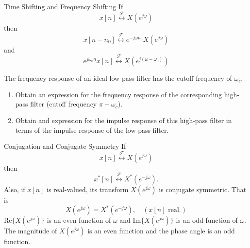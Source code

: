 \begin{frame}{Time Shifting and Frequency Shifting}
    If
    \begin{equation*}
        x[n] \overset{\mathcal{F}}{\leftrightarrow} X(e^{j\omega})
    \end{equation*}
    then
    \begin{equation*}
        x[n-n_0] \overset{\mathcal{F}}{\leftrightarrow} e^{-j\omega n_0}X(e^{j\omega})
    \end{equation*}
    and
    \begin{equation*}
        e^{j\omega_0 n}x[n] \overset{\mathcal{F}}{\leftrightarrow} X\left(e^{j(\omega - \omega_0)}\right)
    \end{equation*}
\end{frame}



\begin{frame}
    \begin{example}
        The frequency response of an ideal low-pass filter has the cutoff frequency of $\omega_c$.
        \begin{enumerate}
            \item Obtain an expression for the frequency response of the corresponding high-pass filter (cutoff frequency $\pi - \omega_c$).
            \item Obtain and expression for the impulse response of this high-pass filter in terms of the impulse response of the low-pass filter.
        \end{enumerate}
     \end{example}
\end{frame}


\begin{frame}{Conjugation and Conjugate Symmetry}
    If
    \begin{equation*}
        x[n] \overset{\mathcal{F}}{\leftrightarrow} X(e^{j\omega})
    \end{equation*}
    then
    \begin{equation*}
        x^\ast[n] \overset{\mathcal{F}}{\leftrightarrow} X^\ast(e^{-j\omega}).
    \end{equation*}
    Also, if $x[n]$ is real-valued, its transform $X(e^{j\omega})$ is conjugate symmetric. That is
    \begin{equation*}
        X(e^{j\omega}) = X^\ast(e^{-j\omega}), \quad (x[n] \text{ real}.)
    \end{equation*}
    $\mathrm{Re}\{X(e^{j\omega})\}$ is an even function of $\omega$ and  $\mathrm{Im}\{X(e^{j\omega})\}$ is an odd function of $\omega$.\\
    The magnitude of $X(e^{j\omega})$ is an even function and the phase angle is an odd function.
\end{frame}

